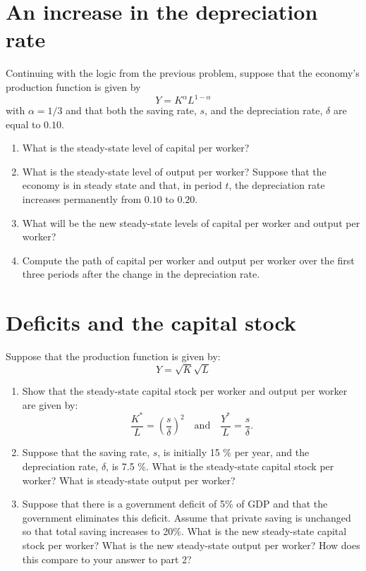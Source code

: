 \documentclass[]{book}
\theoremstyle{definition}
\theoremstyle{definition}
\theoremstyle{definition}
\theoremstyle{remark}
\begin{document}
\section{An increase in the depreciation
rate}\label{an-increase-in-the-depreciation-rate}

Continuing with the logic from the previous problem, suppose that the
economy's production function is given by \[Y=K^{\alpha}L^{1-\alpha}\]
with \(\alpha=1/3\) and that both the saving rate, \(s\), and the
depreciation rate, \(\delta\) are equal to \(0.10\).

\begin{enumerate}
\def\labelenumi{\arabic{enumi}.}
\item
  What is the steady-state level of capital per worker?
\item
  What is the steady-state level of output per worker? Suppose that the
  economy is in steady state and that, in period \(t\), the depreciation
  rate increases permanently from \(0.10\) to \(0.20\).
\item
  What will be the new steady-state levels of capital per worker and
  output per worker?
\item
  Compute the path of capital per worker and output per worker over the
  first three periods after the change in the depreciation rate.
\end{enumerate}

\section{Deficits and the capital
stock}\label{deficits-and-the-capital-stock}

Suppose that the production function is given by: \[Y=\sqrt{K}\sqrt{L}\]

\begin{enumerate}
\def\labelenumi{\arabic{enumi}.}
\item
  Show that the steady-state capital stock per worker and output per
  worker are given by:
  \[\frac{K^{*}}{L}=\left(\frac{s}{\delta}\right)^{2} \quad \text{and} \quad \frac{Y^{*}}{L}=\frac{s}{\delta}.\]
\item
  Suppose that the saving rate, \(s\), is initially 15 \% per year, and
  the depreciation rate, \(\delta\), is 7.5 \%. What is the steady-state
  capital stock per worker? What is steady-state output per worker?
\item
  Suppose that there is a government deficit of 5\% of GDP and that the
  government eliminates this deficit. Assume that private saving is
  unchanged so that total saving increases to 20\%. What is the new
  steady-state capital stock per worker? What is the new steady-state
  output per worker? How does this compare to your answer to part 2?
\end{enumerate}
\end{document}
